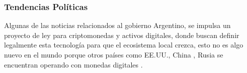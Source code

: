 \subsubsection{Tendencias Políticas}
Algunas de las noticias relacionados al gobierno Argentino, se impulsa un 
proyecto de ley para criptomonedas y activos digitales, donde buscan definir legalmente
esta tecnología para que el ecosistema local crezca, esto no es algo nuevo en el mundo
porque otros países como EE.UU., China , Rusia se encuentran operando con monedas digitales \cite[]{dagostino_exclusivo_nodate}.


